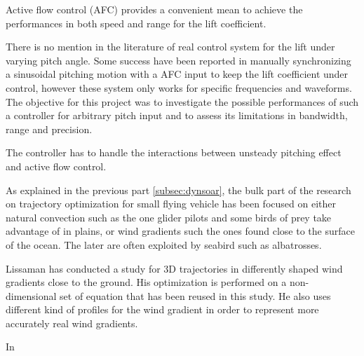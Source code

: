 \par Active flow control (AFC) provides a convenient mean to achieve the performances in both speed and range for the lift coefficient. 

\par There is no mention in the literature of real control system for the lift under varying pitch angle.
Some success have been reported in manually synchronizing a sinusoidal pitching motion with a AFC input to keep the lift coefficient under control, however these system only works for specific frequencies and waveforms. 
The objective for this project was to investigate the possible performances of such a controller for arbitrary pitch input and to assess its limitations in bandwidth, range and precision.

\par The controller has to handle the interactions between unsteady pitching effect and active flow control.



\par As explained in the previous part \ref{subsec:dynsoar}, the bulk part of the research on trajectory optimization for small flying vehicle has been focused on either natural convection such as the one glider pilots and some birds of prey take advantage of in plains, or wind gradients such the ones found close to the surface of the ocean.
The later are often exploited by seabird such as albatrosses.

\par Lissaman \cite{lissaman2005wind} has conducted a study for 3D trajectories in differently shaped wind gradients close to the ground.
His optimization is performed on a non-dimensional set of equation that has been reused in this study.
He also uses different kind of profiles for the wind gradient in order to represent more accurately real wind gradients.

\par In 

